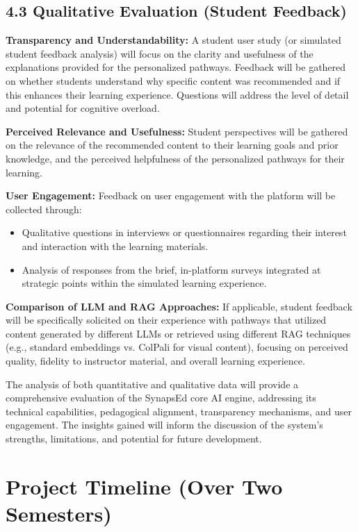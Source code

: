\documentclass{stylefiles/capstone}
\begin{document}
\subsection{4.3 Qualitative Evaluation (Student Feedback)}

\textbf{Transparency and Understandability:}  
A student user study (or simulated student feedback analysis) will focus on the clarity and usefulness of the explanations provided for the personalized pathways. Feedback will be gathered on whether students understand why specific content was recommended and if this enhances their learning experience. Questions will address the level of detail and potential for cognitive overload.

\textbf{Perceived Relevance and Usefulness:}  
Student perspectives will be gathered on the relevance of the recommended content to their learning goals and prior knowledge, and the perceived helpfulness of the personalized pathways for their learning.

\textbf{User Engagement:}  
Feedback on user engagement with the platform will be collected through:
\begin{itemize}
  \item Qualitative questions in interviews or questionnaires regarding their interest and interaction with the learning materials.
  \item Analysis of responses from the brief, in-platform surveys integrated at strategic points within the simulated learning experience.
\end{itemize}

\textbf{Comparison of LLM and RAG Approaches:}  
If applicable, student feedback will be specifically solicited on their experience with pathways that utilized content generated by different LLMs or retrieved using different RAG techniques (e.g., standard embeddings vs. ColPali for visual content), focusing on perceived quality, fidelity to instructor material, and overall learning experience.

The analysis of both quantitative and qualitative data will provide a comprehensive evaluation of the SynapsEd core AI engine, addressing its technical capabilities, pedagogical alignment, transparency mechanisms, and user engagement. The insights gained will inform the discussion of the system's strengths, limitations, and potential for future development.

\section{Project Timeline (Over Two Semesters)}
\end{document}
